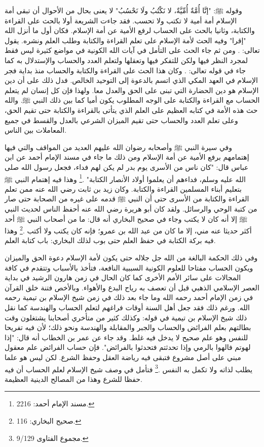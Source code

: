وقوله ﷺ: "إنَّا أُمَّةٌ أُمِّيَّةٌ، لا نَكْتُبُ ولَا نَحْسُبُ" لا يعنى بحال من الأحوال أن تبقى أمة الإسلام أمة أمية لا تكتب ولا تحسب.  فقد جاءت الشريعة أولا بالحث على القراءة والكتابة، وثانيا بالحث على الحساب لرفع الأمية عن أمة الإسلام. فكان أول ما أنزل الله "إقرا" وفيه الحث لأمة الإسلام على تعلم القراءة والكتابة وطلب العلم ونشره. يقول تعالى:
\quranayah*[96][1-5]{\footnotesize \surahname*[96]}.
ومن ثم جاء الحث على التأمل في آيات الله الكونية في مواضع كثيرة ليس فقط لمجرد النظر فيها ولكن للتفكر فيها وتعقلها ولتعلم العدد والحساب والإستدلال به كما جاء في قوله تعالى: \quranayah*[10][5]{\footnotesize \surahname*[10]}. وكان هذا الحث على القراءة والكتابة والحساب منذ بداية فجر الإسلام في العهد المكي الذي اتسم بالدعوة إلى التوحيد الخالص. فدل ذلك على أن دين الإسلام هو دين الحضارة التي تبنى على الحق والعدل معا. ولهذا فإن كل إنسان لم يتعلم الحساب مع القراءة والكتابة على الوجه المطلوب يكون أميا كما بين ذلك النبي ﷺ. والله حث هذه الأمة في كتابه العظيم على العلم الذي يتأتى بالقراءة والكتابة حتى تقيم الحق، وعلى تعلم العدد والحساب حتى تقيم الميزان الشرعي بالعدل والقسط في جميع المعاملات بين الناس. 

وفي سيرة النبي ﷺ وأصحابه رضوان الله عليهم العديد من المواقف والتي فيها إهتمامهم برفع الأمية عن أمة الإسلام ومن ذلك ما جاء في مسند الإمام أحمد عن ابن عباس قال: "كان ناس من الأسرى يوم بدر لم يكن لهم فداء، فجعل رسول الله صلى الله عليه وسلم، فداءهم أن يعلموا أولاد الأنصار الكتابة" \href{https://shamela.ws/book/25794/1602#p1}{\faExternalLink} \cite{ahmid}.\footnote{مسند الإمام أحمد: 2216.}  وهذا فيه إهتمام النبي ﷺ بتعليم أبناء المسلمين القراءة والكتابة. وكان زيد بن ثابت رضي الله عنه ممن تعلم القراءة والكتابة من الأسرى حتى أن النبي ﷺ قدمه على غيره من الصحابة حتى صار من كتبة الوحي والرسائل. ولقد كان أبو هريرة رضي الله عنه أحفظ الناس لحديث النبي ﷺ إلا أنه كان لا يكتب وجاء في صحيح البخاري أنه قال: ما من أصحاب النبي ﷺ أحد أكثر حديثا عنه مني، إلا ما كان من عبد الله بن عمرو؛ فإنه كان يكتب ولا أكتب\href{https://shamela.ws/book/1284/250#p1}{\faExternalLink} \cite{ahmid}.\footnote{صحيح البخاري: 116.} وهذا فيه بركة الكتابة في حفظ العلم حتى بوب لذلك البخاري: باب كتابة العلم. 

وفي ذلك الحكمة البالغة من الله جل جلاله حتى يكون لأمة الإسلام دعوة الحق والميزان ويكون الحساب مفتاحا للعلوم الكونية السببية النافعة، فتأخذ بالأسباب وتتقدم في كافة المجالات على سائر الأمم الأخرى كما كان الحال في زمن هارون الرشيد في بداية العصر الإسلامي الذهبي قبل أن تعصف به رياح البدع والأهواء. وبالأخص فتنة خلق القرآن في زمن الإمام أحمد رحمه الله وما جاء بعد ذلك في زمن شيخ الإسلام بن تيمية رحمه الله. ورغم ذلك فقد جعل أهل السنة أوقات فراغهم لتعلم الحساب والهندسة كما نقل ذلك شيخ الإسلام بن تيمية في قوله: وكذلك كثير من متأخري أصحابنا يشتغلون وقت بطالتهم بعلم الفرائض والحساب والجبر والمقابلة والهندسة ونحو ذلك؛ لأن فيه تفريحا للنفس وهو علم صحيح لا يدخل فيه غلط. وقد جاء عن عمر بن الخطاب أنه قال: "إذا لهوتم فالهوا بالرمي وإذا تحدثتم فتحدثوا بالفرائض". فإن حساب الفرائض علم معقول مبني على أصل مشروع فتبقى فيه رياضة العقل وحفظ الشرع. لكن ليس هو علما يطلب لذاته ولا تكمل به النفس \href{https://shamela.ws/book/7289/4394#p1}{\faExternalLink} \cite{ibnTaimia_Majmoo}.\footnote{مجموع الفتاوى 9/129.} فتأمل في وصف شيخ الإسلام لعلم الحساب أن فيه حفظا للشرع وهذا من المصالح الدينية العظيمة.

